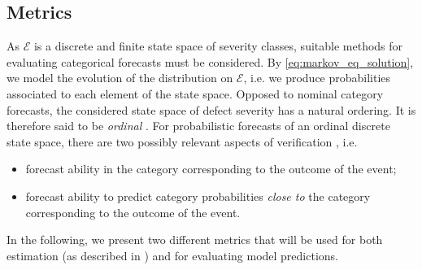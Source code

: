 \subsection{Metrics} \label{sec:error_metrics}
As $\mathcal{E}$ is a discrete and finite state space of severity classes, suitable methods for evaluating categorical forecasts must be considered. By \cref{eq:markov_eq_solution}, we model the evolution of the distribution on $\mathcal{E}$, i.e. we produce probabilities associated to each element of the state space.
Opposed to nominal category forecasts, the considered state space of defect severity has a natural ordering. It is therefore said to be \textit{ordinal} \citep{broecker2008a,hamill1997}.
For probabilistic forecasts of an ordinal discrete state space, there are two possibly relevant aspects of verification \citep{Weijs2010}, i.e. 
\begin{itemize}
\item forecast ability in the category corresponding to the outcome of the event;
\item forecast ability to predict category probabilities \textit{close to} the category corresponding to the outcome of the event.
\end{itemize} 
In the following, we present two different metrics that will be used for both estimation (as described in ) and for evaluating model predictions.



